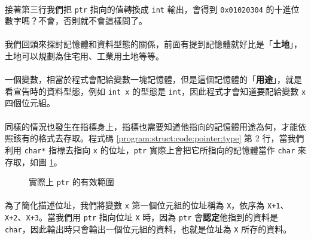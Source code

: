 \documentclass[12pt,a4paper,oneside]{article}
\begin{document}
\begin{CJK}{UTF8}{bkai}
\paragraph{}接著第三行我們把 \lstinline!ptr! 指向的值轉換成 \lstinline!int! 輸出，會得到 \lstinline!0x01020304! 的十進位數字嗎？不會，否則就不會這樣問了。
\paragraph{}我們回頭來探討記憶體和資料型態的關係，前面有提到記憶體就好比是「\textbf{土地}」，土地可以規劃為住宅用、工業用土地等等。
\paragraph{}一個變數，相當於程式會配給變數一塊記憶體，但是這個記憶體的「\textbf{用途}」，就是看宣告時的資料型態，例如 \lstinline!int x! 的型態是 \lstinline!int!，因此程式才會知道要配給變數 \lstinline!x! 四個位元組。
\paragraph{}同樣的情況也發生在指標身上，指標也需要知道他指向的記憶體用途為何，才能依照該有的格式去存取。程式碼 \ref{program:struct:code:pointer:type} 第 2 行，當我們利用 \lstinline!char*! 指標去指向 \lstinline!x! 的位址，\lstinline!ptr! 實際上會把它所指向的記憶體當作 \lstinline!char! 來存取，如圖 \ref{program:struct:fig:pointer:type}。

\begin{figure}[h!]
\centering
{}
\caption{實際上 \lstinline!ptr! 的有效範圍}
\label{program:struct:fig:pointer:type}
\end{figure}

\paragraph{}為了簡化描述位址，我們將變數 \lstinline!x! 第一個位元組的位址稱為 \texttt{X}，依序為 \texttt{X+1}、\texttt{X+2}、\texttt{X+3}。當我們用 \lstinline!ptr! 指向位址 \lstinline!X! 時，因為 \lstinline!ptr! 會\textbf{認定}他指到的資料是 \lstinline!char!，因此輸出時只會輸出一個位元組的資料，也就是位址為 \lstinline!X! 所存的資料。

\end{CJK}
\end{document}
